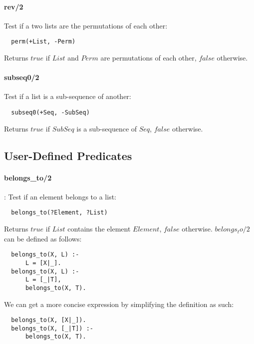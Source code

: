 \documentclass{article}
\begin{document}
\begin{multicols}{2}
  \paragraph{rev/2} Test if a two lists are the permutations of each other:
  
  \begin{lstlisting}
  perm(+List, -Perm)
  \end{lstlisting} 
  
  Returns $true$ if $List$ and $Perm$ are permutations of each other, $false$ otherwise.
  
  \paragraph{subseq0/2} Test if a list is a sub-sequence of another:
  
  \begin{lstlisting}
  subseq0(+Seq, -SubSeq)
  \end{lstlisting} 
  
  Returns $true$ if $SubSeq$ is a sub-sequence of $Seq$, $false$ otherwise.
  
  \subsection{User-Defined Predicates}

  \paragraph{belongs\_to/2}: Test if an element belongs to a list:
  
  \begin{lstlisting}
  belongs_to(?Element, ?List)
  \end{lstlisting} 
  
  Returns $true$ if $List$ contains the element $Element$, $false$ otherwise. $belongs_to/2$ can be defined as follows:

  \begin{lstlisting}
  belongs_to(X, L) :-
      L = [X|_].
  belongs_to(X, L) :-
      L = [_|T],
      belongs_to(X, T).
  \end{lstlisting} 
  
  We can get a more concise expression by simplifying the definition as such:

  \begin{lstlisting}
  belongs_to(X, [X|_]).
  belongs_to(X, [_|T]) :-
      belongs_to(X, T).
  \end{lstlisting} 
  

\end{multicols}
\end{document}
